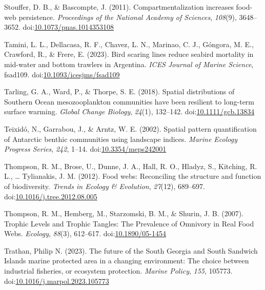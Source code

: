 \documentclass[
]{article}
\newlength{\cslhangindent}
\newlength{\cslentryspacingunit} %
\newenvironment{CSLReferences}[2] %
 {%
  \setlength{\parindent}{0pt}
  \ifodd #1
  \let\oldpar\par
  \def\par{\hangindent=\cslhangindent\oldpar}
  \fi
  \setlength{\parskip}{#2\cslentryspacingunit}
 }%
 {}
\begin{document}
\begin{CSLReferences}{1}{0}
\leavevmode{}%
Stouffer, D. B., \& Bascompte, J. (2011). Compartmentalization increases
food-web persistence. \emph{Proceedings of the National Academy of
Sciences}, \emph{108}(9), 3648--3652.
doi:\href{https://doi.org/10.1073/pnas.1014353108}{10.1073/pnas.1014353108}

\leavevmode{}%
Tamini, L. L., Dellacasa, R. F., Chavez, L. N., Marinao, C. J., Góngora,
M. E., Crawford, R., \& Frere, E. (2023). Bird scaring lines reduce
seabird mortality in mid-water and bottom trawlers in {Argentina}.
\emph{ICES Journal of Marine Science}, fsad109.
doi:\href{https://doi.org/10.1093/icesjms/fsad109}{10.1093/icesjms/fsad109}

\leavevmode{}%
Tarling, G. A., Ward, P., \& Thorpe, S. E. (2018). Spatial distributions
of {Southern Ocean} mesozooplankton communities have been resilient to
long-term surface warming. \emph{Global Change Biology}, \emph{24}(1),
132--142.
doi:\href{https://doi.org/10.1111/gcb.13834}{10.1111/gcb.13834}

\leavevmode{}%
Teixidó, N., Garrabou, J., \& Arntz, W. E. (2002). Spatial pattern
quantification of {Antarctic} benthic communities using landscape
indices. \emph{Marine Ecology Progress Series}, \emph{242}, 1--14.
doi:\href{https://doi.org/10.3354/meps242001}{10.3354/meps242001}

\leavevmode{}%
Thompson, R. M., Brose, U., Dunne, J. A., Hall, R. O., Hladyz, S.,
Kitching, R. L., \ldots{} Tylianakis, J. M. (2012). Food webs:
Reconciling the structure and function of biodiversity. \emph{Trends in
Ecology \& Evolution}, \emph{27}(12), 689--697.
doi:\href{https://doi.org/10.1016/j.tree.2012.08.005}{10.1016/j.tree.2012.08.005}

\leavevmode{}%
Thompson, R. M., Hemberg, M., Starzomski, B. M., \& Shurin, J. B.
(2007). Trophic {Levels} and {Trophic Tangles}: {The Prevalence} of
{Omnivory} in {Real Food Webs}. \emph{Ecology}, \emph{88}(3), 612--617.
doi:\href{https://doi.org/10.1890/05-1454}{10.1890/05-1454}

\leavevmode{}%
Trathan, Philip N. (2023). The future of the {South Georgia} and {South
Sandwich Islands} marine protected area in a changing environment: {The}
choice between industrial fisheries, or ecosystem protection.
\emph{Marine Policy}, \emph{155}, 105773.
doi:\href{https://doi.org/10.1016/j.marpol.2023.105773}{10.1016/j.marpol.2023.105773}


\end{CSLReferences}
\end{document}

